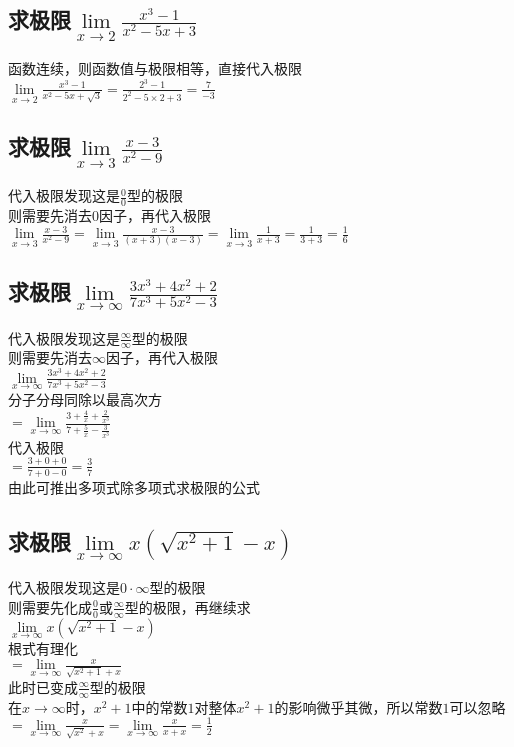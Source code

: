 \documentclass{article}
\begin{document}
\begin{flushleft}
\subsection{
求极限$\lim\limits_{x\to 2}\frac{x^3-1}{x^2-5x+3}$
}
函数连续，则函数值与极限相等，直接代入极限\\
$\lim\limits_{x\to 2}\frac{x^3-1}{x^2-5x+\sqrt3}=\frac{2^3-1}{2^2-5\times2+3}=\frac{7}{-3}$\\

\subsection{
求极限$\lim\limits_{x\to 3}\frac{x-3}{x^2-9}$
}
代入极限发现这是$\frac{0}{0}$型的极限\\
则需要先消去$0$因子，再代入极限\\
$\lim\limits_{x\to 3}\frac{x-3}{x^2-9}=\lim\limits_{x\to 3}\frac{x-3}{(x+3)(x-3)}=\lim\limits_{x\to 3}\frac{1}{x+3}=\frac{1}{3+3}=\frac{1}{6}$\\

\subsection{
求极限$\lim\limits_{x\to \infty}\frac{3x^3+4x^2+2}{7x^3+5x^2-3}$
}
代入极限发现这是$\frac{\infty}{\infty}$型的极限\\
则需要先消去$\infty$因子，再代入极限\\
$\lim\limits_{x\to \infty}\frac{3x^3+4x^2+2}{7x^3+5x^2-3}$\\
分子分母同除以最高次方\\
$=\lim\limits_{x\to \infty}\frac{3+\frac{4}{x}+\frac{2}{x^3}}{7+\frac{5}{x}-\frac{3}{x^3}}$\\
代入极限\\
$=\frac{3+0+0}{7+0-0}=\frac{3}{7}$\\
由此可推出多项式除多项式求极限的公式\\

\subsection{
求极限$\lim\limits_{x\to \infty}x(\sqrt{x^2+1}-x)$
}
代入极限发现这是$0\cdot\infty$型的极限\\
则需要先化成$\frac{0}{0}$或$\frac{\infty}{\infty}$型的极限，再继续求\\
$\lim\limits_{x\to \infty}x(\sqrt{x^2+1}-x)$\\
根式有理化\\
$=\lim\limits_{x\to \infty}\frac{x}{\sqrt{x^2+1}+x}$\\
此时已变成$\frac{\infty}{\infty}$型的极限\\
在$x\to\infty$时，$x^2+1$中的常数$1$对整体$x^2+1$的影响微乎其微，所以常数$1$可以忽略\\
$=\lim\limits_{x\to \infty}\frac{x}{\sqrt{x^2}+x}
=\lim\limits_{x\to \infty}\frac{x}{x+x}=\frac{1}{2}$\\


\end{flushleft}
\end{document}
